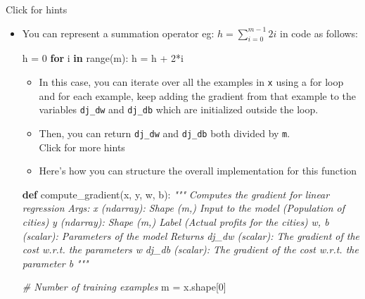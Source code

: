 \documentclass[11pt]{article}
\newenvironment{Shaded}{}{}
\newcommand{\KeywordTok}[1]{\textcolor[rgb]{0.00,0.44,0.13}{\textbf{{#1}}}}
\newcommand{\DecValTok}[1]{\textcolor[rgb]{0.25,0.63,0.44}{{#1}}}
\newcommand{\CommentTok}[1]{\textcolor[rgb]{0.38,0.63,0.69}{\textit{{#1}}}}
\newcommand{\NormalTok}[1]{{#1}}
\newcommand{\ControlFlowTok}[1]{\textcolor[rgb]{0.00,0.44,0.13}{\textbf{{#1}}}}
\newcommand{\OperatorTok}[1]{\textcolor[rgb]{0.40,0.40,0.40}{{#1}}}
\newcommand{\BuiltInTok}[1]{{#1}}
\begin{document}
    Click for hints

\begin{itemize}
\item
  You can represent a summation operator eg:
  \(h = \sum\limits_{i = 0}^{m-1} 2i\) in code as follows:

\begin{Shaded}
\begin{Highlighting}[]
\NormalTok{ h }\OperatorTok{=} \DecValTok{0}
 \ControlFlowTok{for}\NormalTok{ i }\KeywordTok{in} \BuiltInTok{range}\NormalTok{(m):}
\NormalTok{     h }\OperatorTok{=}\NormalTok{ h }\OperatorTok{+} \DecValTok{2}\OperatorTok{*}\NormalTok{i}
\end{Highlighting}
\end{Shaded}

  \begin{itemize}
  \item
    In this case, you can iterate over all the examples in \texttt{x}
    using a for loop and for each example, keep adding the gradient from
    that example to the variables \texttt{dj\_dw} and \texttt{dj\_db}
    which are initialized outside the loop.
  \item
    Then, you can return \texttt{dj\_dw} and \texttt{dj\_db} both
    divided by \texttt{m}.\\

    Click for more hints
  \item
    Here's how you can structure the overall implementation for this
    function
  \end{itemize}

\begin{Shaded}
\begin{Highlighting}[]
\KeywordTok{def}\NormalTok{ compute\_gradient(x, y, w, b): }
    \CommentTok{"""}
\CommentTok{    Computes the gradient for linear regression }
\CommentTok{    Args:}
\CommentTok{      x (ndarray): Shape (m,) Input to the model (Population of cities) }
\CommentTok{      y (ndarray): Shape (m,) Label (Actual profits for the cities)}
\CommentTok{      w, b (scalar): Parameters of the model  }
\CommentTok{    Returns}
\CommentTok{      dj\_dw (scalar): The gradient of the cost w.r.t. the parameters w}
\CommentTok{      dj\_db (scalar): The gradient of the cost w.r.t. the parameter b     }
\CommentTok{    """}

    \CommentTok{\# Number of training examples}
\NormalTok{    m }\OperatorTok{=}\NormalTok{ x.shape[}\DecValTok{0}\NormalTok{]}


\end{Highlighting}
\end{Shaded}
\end{itemize}
\end{document}
